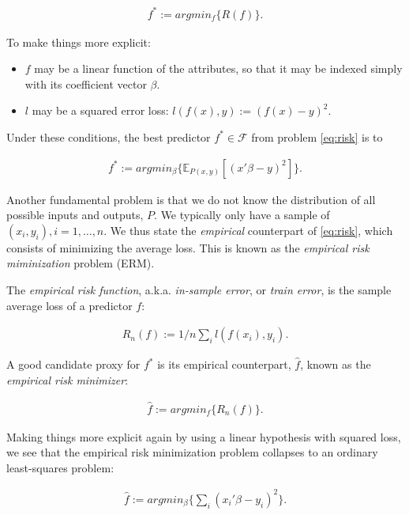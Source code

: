 \documentclass[]{book}
\providecommand{\tightlist}{%
  \setlength{\itemsep}{0pt}\setlength{\parskip}{0pt}}
\theoremstyle{definition}
\theoremstyle{definition}
\theoremstyle{definition}
\theoremstyle{remark}
\let\BeginKnitrBlock\begin \let\EndKnitrBlock\end
\begin{document}
\begin{align}
  f^* := argmin_f \{R(f)\}.
  \label{eq:risk}  
\end{align}

To make things more explicit:

\begin{itemize}
\tightlist
\item
  \(f\) may be a linear function of the attributes, so that it may be
  indexed simply with its coefficient vector \(\beta\).
\item
  \(l\) may be a squared error loss: \(l(f(x),y):=(f(x)-y)^2\).
\end{itemize}

Under these conditions, the best predictor \(f^* \in \mathcal{F}\) from
problem \eqref{eq:risk} is to

\begin{align}
  f^* := argmin_\beta \{ \mathbb{E}_{P(x,y)}[(x'\beta-y)^2] \}.
\end{align}

Another fundamental problem is that we do not know the distribution of
all possible inputs and outputs, \(P\). We typically only have a sample
of \((x_i,y_i), i=1,\dots,n\). We thus state the \emph{empirical}
counterpart of \eqref{eq:risk}, which consists of minimizing the average
loss. This is known as the \emph{empirical risk miminization} problem
(ERM).

\BeginKnitrBlock{definition}[Empirical Risk]
\protect\hypertarget{def:unnamed-chunk-185}{}{\label{def:unnamed-chunk-185}
{} }The \emph{empirical risk function},
a.k.a. \emph{in-sample error}, or \emph{train error}, is the sample
average loss of a predictor \(f\):

\begin{align}
  R_n(f):= 1/n \sum_i l(f(x_i),y_i).
\end{align}
\EndKnitrBlock{definition}

A good candidate proxy for \(f^*\) is its empirical counterpart,
\(\hat f\), known as the \emph{empirical risk minimizer}:

\begin{align}
  \hat f := argmin_f \{ R_n(f) \}.
  \label{eq:erm}  
\end{align}

Making things more explicit again by using a linear hypothesis with
squared loss, we see that the empirical risk minimization problem
collapses to an ordinary least-squares problem:

\begin{align}
  \hat f := argmin_\beta \{ \sum_i (x_i'\beta - y_i)^2 \}.
\end{align}
\end{document}
